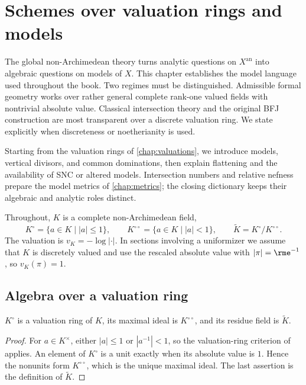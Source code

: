 \chapter{Schemes over valuation rings and models}
\label{chap:models}

The global non-Archimedean theory turns analytic questions on $X^{\mathrm{an}}$
into algebraic questions on models of $X$. This chapter establishes the model
language used throughout the book. Two regimes must be distinguished.
Admissible formal geometry works over rather general complete rank-one valued
fields with nontrivial absolute value. Classical intersection theory and the
original BFJ construction are most transparent over a discrete valuation ring. We state explicitly when
discreteness or noetherianity is used.

Starting from the valuation rings of \cref{chap:valuations}, we introduce
models, vertical divisors, and common dominations, then explain flattening
and the availability of SNC or altered models. Intersection numbers and
relative nefness prepare the model metrics of \cref{chap:metrics}; the
closing dictionary keeps their algebraic and analytic roles distinct.

Throughout, $K$ is a complete non-Archimedean field,
\[
 K^\circ=\{a\in K\mid |a|\leq1\},\qquad
 K^{\circ\circ}=\{a\in K\mid |a|<1\},\qquad
 \widetilde K=K^\circ/K^{\circ\circ}.
\]
The valuation is $v_K=-\log|\cdot|$. In sections involving a uniformizer we
assume that $K$ is discretely valued and use the rescaled absolute value
with $|\pi|=\rme^{-1}$, so $v_K(\pi)=1$.

\section{Algebra over a valuation ring}

\begin{proposition}
\label{prop:valuation-ring-basic}
$K^\circ$ is a valuation ring of $K$, its maximal ideal is
$K^{\circ\circ}$, and its residue field is $\widetilde K$.
\end{proposition}
\begin{proof}
For $a\in K^\times$, either $|a|\leq1$ or $|a^{-1}|<1$, so the valuation-ring
criterion of  applies.
An element of $K^\circ$ is a unit exactly when its absolute value is $1$.
Hence the nonunits form $K^{\circ\circ}$, which is the unique maximal ideal.
The last assertion is the definition of $\widetilde K$.
\end{proof}

